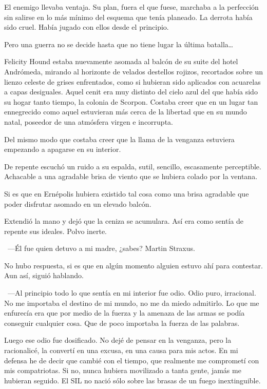 El enemigo llevaba ventaja. Su plan, fuera el que fuese, marchaba a la perfección sin salirse en lo más mínimo del esquema que tenía planeado. La derrota había sido cruel. Había jugado con ellos desde el principio.

Pero una guerra no se decide hasta que no tiene lugar la última batalla\dots

\fancyparbreak
Felicity Hound estaba nuevamente asomada al balcón de su suite del hotel Andrómeda, mirando al horizonte de velados destellos rojizos, recortados sobre un lienzo celeste de grises enfrentados, como si hubieran sido aplicados con acuarelas a capas desiguales. Aquel cenit era muy distinto del cielo azul del que había sido su hogar tanto tiempo, la colonia de Scorpon. Costaba creer que en un lugar tan ennegrecido como aquel estuvieran más cerca de la libertad que en su mundo natal, poseedor de una atmósfera virgen e incorrupta.

Del mismo modo que costaba creer que la llama de la venganza estuviera empezando a apagarse en su interior.

De repente escuchó un ruido a su espalda, sutil, sencillo, escasamente perceptible. Achacable a una agradable brisa de viento que se hubiera colado por la ventana.

Si es que en Ernépolis hubiera existido tal cosa como una brisa agradable que poder disfrutar asomado en un elevado balcón.

Extendió la mano y dejó que la ceniza se acumulara. Así era como sentía de repente sus ideales. Polvo inerte.

~---Él fue quien detuvo a mi madre, ¿sabes? Martin Straxus.

No hubo respuesta, si es que en algún momento alguien estuvo ahí para contestar. Aun así, siguió hablando.

~---Al principio todo lo que sentía en mi interior fue odio. Odio puro, irracional. No me importaba el destino de mi mundo, no me da miedo admitirlo. Lo que me enfurecía era que por medio de la fuerza y la amenaza de las armas se podía conseguir cualquier cosa. Que de poco importaba la fuerza de las palabras.

\rquoti Luego ese odio fue dosificado. No dejé de pensar en la venganza, pero la racionalicé, la convertí en una excusa, en una causa para mis actos. En mi defensa he de decir que cambié con el tiempo, que realmente me comprometí con mis compatriotas. Si no, nunca hubiera movilizado a tanta gente, jamás me hubieran seguido. El SIL no nació sólo sobre las brasas de un fuego inextinguible.

